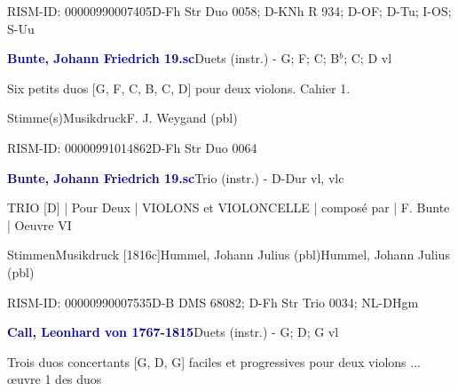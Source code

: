 \documentclass[twocolumn, 12pt]{book}
\begin{document}
\par RISM-ID: 00000990007405\newline D-Fh  Str Duo 0058; D-KNh  R 934; D-OF; D-Tu; I-OS; S-Uu
\par \vspace{16pt} \textcolor{darkblue}{\textbf{Bunte, Johann Friedrich  19.sc}}\hfillplus{\textbf{[252]}}\newline Duets (instr.) - G; F; C; B$^b$; C; D vl
\par \begin{itshape}Six petits duos [G, F, C, B, C, D] pour deux violons. Cahier 1.\end{itshape} 
\par \textcolor{darkblue}{}  Stimme(s)\newline Musikdruck\newline F. J. Weygand  (pbl)
\par RISM-ID: 00000991014862\newline D-Fh  Str Duo 0064
\par \vspace{16pt} \textcolor{darkblue}{\textbf{Bunte, Johann Friedrich  19.sc}}\hfillplus{\textbf{[253]}}\newline Trio (instr.) - D-Dur vl, vlc
\par \begin{itshape}TRIO [D] | Pour Deux | VIOLONS et VIOLONCELLE | composé par | F. Bunte | Oeuvre VI\end{itshape} 
\par \textcolor{darkblue}{}  Stimmen\newline Musikdruck  [1816c]\newline Hummel, Johann Julius  (pbl)\newline Hummel, Johann Julius  (pbl)
\par RISM-ID: 00000990007535\newline D-B  DMS 68082; D-Fh  Str Trio 0034; NL-DHgm
\par \vspace{16pt} \textcolor{darkblue}{\textbf{Call, Leonhard von  1767-1815}}\hfillplus{\textbf{[254]}}\newline Duets (instr.) - G; D; G vl
\par \begin{itshape}Trois duos concertants [G, D, G] faciles et progressives pour deux violons ... œuvre 1 des duos\end{itshape} 
\end{document}
